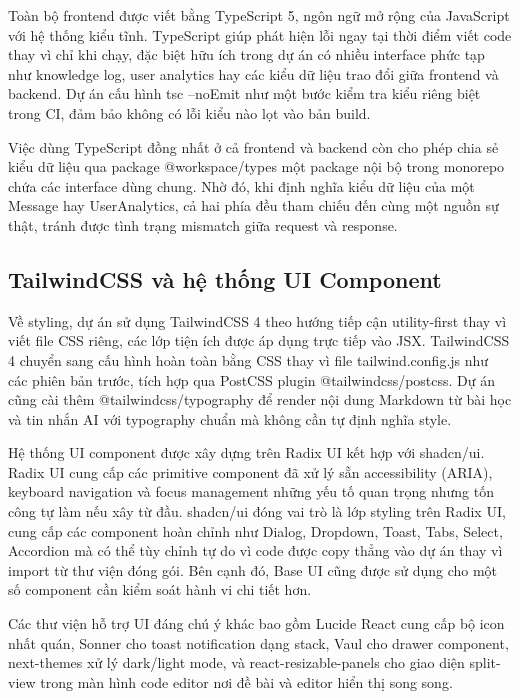 \documentclass[../main.tex]{subfiles}
\begin{document}
Toàn bộ frontend được viết bằng TypeScript 5, ngôn ngữ mở rộng của JavaScript với hệ thống kiểu tĩnh. TypeScript giúp phát hiện lỗi ngay tại thời điểm viết code thay vì chỉ khi chạy, đặc biệt hữu ích trong dự án có nhiều interface phức tạp như knowledge log, user analytics hay các kiểu dữ liệu trao đổi giữa frontend và backend. Dự án cấu hình tsc --noEmit như một bước kiểm tra kiểu riêng biệt trong CI, đảm bảo không có lỗi kiểu nào lọt vào bản build.

Việc dùng TypeScript đồng nhất ở cả frontend và backend còn cho phép chia sẻ kiểu dữ liệu qua package @workspace/types một package nội bộ trong monorepo chứa các interface dùng chung. Nhờ đó, khi định nghĩa kiểu dữ liệu của một Message hay UserAnalytics, cả hai phía đều tham chiếu đến cùng một nguồn sự thật, tránh được tình trạng mismatch giữa request và response.

\subsection{TailwindCSS và hệ thống UI Component}

Về styling, dự án sử dụng TailwindCSS 4 theo hướng tiếp cận utility-first thay vì viết file CSS riêng, các lớp tiện ích được áp dụng trực tiếp vào JSX. TailwindCSS 4 chuyển sang cấu hình hoàn toàn bằng CSS thay vì file tailwind.config.js như các phiên bản trước, tích hợp qua PostCSS plugin @tailwindcss/postcss. Dự án cũng cài thêm @tailwindcss/typography để render nội dung Markdown từ bài học và tin nhắn AI với typography chuẩn mà không cần tự định nghĩa style.

Hệ thống UI component được xây dựng trên Radix UI kết hợp với shadcn/ui. Radix UI cung cấp các primitive component đã xử lý sẵn accessibility (ARIA), keyboard navigation và focus management những yếu tố quan trọng nhưng tốn công tự làm nếu xây từ đầu. shadcn/ui đóng vai trò là lớp styling trên Radix UI, cung cấp các component hoàn chỉnh như Dialog, Dropdown, Toast, Tabs, Select, Accordion mà có thể tùy chỉnh tự do vì code được copy thẳng vào dự án thay vì import từ thư viện đóng gói. Bên cạnh đó, Base UI cũng được sử dụng cho một số component cần kiểm soát hành vi chi tiết hơn.

Các thư viện hỗ trợ UI đáng chú ý khác bao gồm Lucide React cung cấp bộ icon nhất quán, Sonner cho toast notification dạng stack, Vaul cho drawer component, next-themes xử lý dark/light mode, và react-resizable-panels cho giao diện split-view trong màn hình code editor nơi đề bài và editor hiển thị song song.
\end{document}
